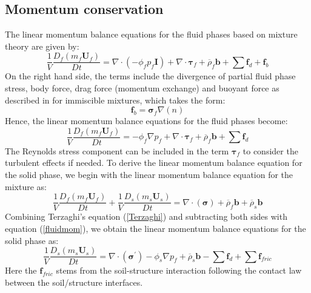 \documentclass[preprint,12pt]{elsarticle}
\begin{document}
\subsection{\textsf{Momentum conservation}}
\label{Momentum}
%
%
The linear momentum balance equations for the fluid phases based on mixture theory are given by:\\
%
%
\begin{equation}
    \frac{1}{V}\frac{D_f(m_f \pmb{U}_f)}{Dt} = 
    \nabla \cdot (-\phi_f p_f\pmb{I}) + \nabla \cdot \pmb{\tau}_f + \overline{\rho}_f \pmb{b} +  \sum \pmb{f}_{d} + \pmb{f}_b
\end {equation}
%
%
On the right hand side, the terms include the divergence of partial fluid phase stress, body force, drag force (momentum exchange) and buoyant force as described in \cite{DRUMHELLER} for immiscible mixtures, which takes the form:
%
%
\begin{equation}
    \pmb{f}_b = \pmb{\sigma}_f\nabla (n)
\end {equation}
%
%
Hence, the linear momentum balance equations for the fluid phases become:
%
%
\begin{equation}
    \label{fluidmom}
     \frac{1}{V}\frac{D_f(m_f \pmb{U}_f)}{Dt} = -\phi_f \nabla p_f + \nabla \cdot \pmb{\tau}_f +  \overline{\rho}_f \pmb{b} +  \sum  \pmb{f}_{d}
\end {equation}
%
%
The Reynolds stress component can be included in the term $\pmb{\tau}_f$ to consider the turbulent effects if needed. To derive the linear momentum balance equation for the solid phase, we begin with the linear momentum balance equation for the mixture as:
%
%
\begin{equation}
    \label{totalmom}
     \frac{1}{V}\frac{D_f(m_f \pmb{U}_f)}{Dt}
    +  \frac{1}{V}\frac{D_s(m_s \pmb{U}_s)}{Dt} = 
    \nabla \cdot (\pmb{\sigma}) + \overline{\rho}_f \pmb{b} 
    + \overline{\rho}_s \pmb{b}
\end {equation}
%
%
Combining Terzaghi's equation (\ref{Terzaghi}) and subtracting both sides with equation (\ref{fluidmom}), we obtain the linear momentum balance equations for the solid phase as:
%
%
\begin{equation}
    \label{solidmom}
     \frac{1}{V}\frac{D_s(m_s \pmb{U}_s)}{Dt} = 
    \nabla \cdot (\pmb{\sigma}^\prime) - \phi_s \nabla p_f 
    + \overline{\rho}_s \pmb{b}   -  \sum \pmb{f}_{d} +  \sum \pmb{f}_{fric}
\end {equation}
%
%
Here the $\pmb{f}_{fric}$ stems from the soil-structure interaction following the contact law between the soil/structure interfaces.
\end{document}
